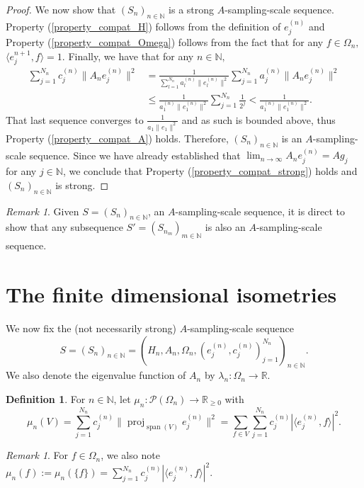 \documentclass{amsart}
\theoremstyle{definition}
\newtheorem{definition}[thm]{Definition}
\theoremstyle{remark}
\newtheorem{remark}[thm]{Remark}
\def \Proj{\operatorname{proj}}
\def \Span{\operatorname{span}}
\def \LL{\langle}
\def \RR{\rangle}
\begin{document}
\begin{proof}
	We now show that $(S_n)_{n\in\mathbb{N}}$ is a strong $A$-sampling-scale sequence. Property (\ref{property_compat_H}) follows from the definition of $e_j^{(n)}$ and Property (\ref{property_compat_Omega}) follows from the fact that for any $f\in\Omega_n,$ $\LL e_j^{n+1}, f\RR=1.$ Finally, we have that  for any $n\in\mathbb{N},$
	\begin{align*}
		\sum_{j=1}^{N_n} c_j^{(n)}\|A_ne_j^{(n)}\|^2&=\frac{1}{\sum_{l=1}^{N_n}a_l^{(n)}\|e_l^{(n)}\|^2}\sum_{j=1}^{N_n}a_j^{(n)}\|A_ne_j^{(n)}\|^2\\
		&\leq \frac{1}{a_1^{(n)}\|e_1^{(n)}\|^2}\sum_{j=1}^{N_n}\frac{1}{2^j}<\frac{1}{a_1^{(n)}\|e_1^{(n)}\|^2}.
	\end{align*}
	That last sequence converges to $\frac{1}{a_1\|e_1\|^2}$ and as such is bounded above, thus Property (\ref{property_compat_A}) holds. Therefore, $(S_n)_{n\in\mathbb{N}}$ is an $A$-sampling-scale sequence. Since we have already established that $\lim_{n\rightarrow\infty} A_ne_j^{(n)}=A g_j$ for any $j\in\mathbb{N}$, we conclude that Property (\ref{property_compat_strong}) holds and $(S_n)_{n\in\mathbb{N}}$ is strong.
\end{proof}
\begin{remark}\label{remark_sampling_scale_subsequences}
	Given $S=(S_n)_{n\in\mathbb{N}}$, an $A$-sampling-scale sequence, it is direct to show that any subsequence $S'=(S_{n_m})_{m\in\mathbb{N}}$ is also an $A$-sampling-scale sequence.
\end{remark}
\section{The finite dimensional isometries}

We now fix the (not necessarily strong) $A$-sampling-scale sequence $$S=(S_n)_{n\in\mathbb{N}}=(H_n,A_n,\Omega_n,(e_j^{(n)},c_j^{(n)})_{j=1}^{N_n})_{n\in\mathbb{N}}.$$ We also denote the eigenvalue function of $A_n$ by $\lambda_n:\Omega_n\rightarrow \mathbb{R}.$
\begin{definition}
	For $n\in\mathbb{N}$, let $\mu_n:\mathcal{P}(\Omega_n)\rightarrow\mathbb{R}_{\geq 0}$ with $$\mu_n(V)=\sum_{j=1}^{N_n} c_j^{(n)}\|\Proj_{\Span(V)}e_j^{(n)}\|^2=\sum_{f\in V}\sum_{j=1}^{N_n}c_j^{(n)}|\langle e_j^{(n)}, f\rangle|^2. $$
\end{definition}
\begin{remark}
	For $f\in\Omega_n$, we also note $\mu_n(f):=\mu_n(\{f\})=\sum_{j=1}^{N_n}c_j^{(n)}|\langle e_j^{(n)}, f\rangle|^2.$
\end{remark}
\end{document}
